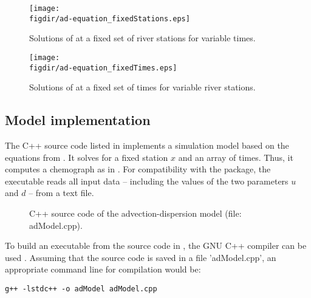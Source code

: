 \begin{figure}
  \centering
  \texttt{[image: \\figdir/ad-equation\_fixedStations.eps]}
  \caption{Solutions of  at a fixed set of river stations for variable times. \label{fig:mops:example_mcs:modelEqn:fixedStations}}
\end{figure}

\begin{figure}
  \centering
  \texttt{[image: \\figdir/ad-equation\_fixedTimes.eps]}
  \caption{Solutions of  at a fixed set of times for variable river stations. \label{fig:mops:example_mcs:modelEqn:fixedTimes}}
\end{figure}

\subsection{Model implementation} \label{sec:mops:example_mcs:modelImpl}
The C++ source code listed in  implements a simulation model based on the equations from . It solves  for a fixed station $x$ and an array of times. Thus, it computes a chemograph as in . For compatibility with the  package, the executable reads all input data -- including the values of the two parameters $u$ and $d$ -- from a text file.

\begin{figure*}
  
  \caption{C++ source code of the advection-dispersion model (file: adModel.cpp). \label{fig:mops:example_mcs:adModel_code}}
\end{figure*}

To build an executable from the source code in , the GNU C++ compiler can be used \citep[see][for mode info]{Echse-Install-Doc}. Assuming that the source code is saved in a file 'adModel.cpp', an appropriate command line for compilation would be:

\begin{lstlisting}[style=shell]
  g++ -lstdc++ -o adModel adModel.cpp
\end{lstlisting}

